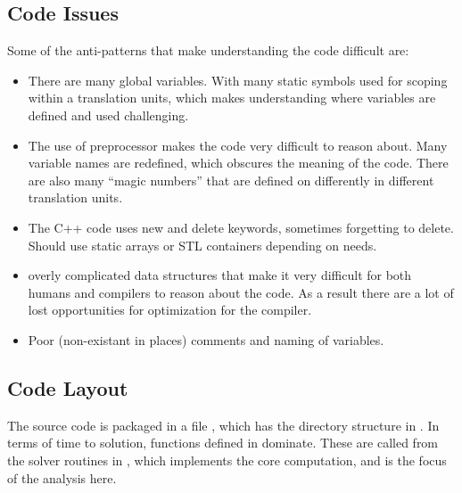 \subsection{Code Issues}
Some of the anti-patterns that make understanding the code difficult are:
\begin{itemize}
    \item
        There are many global variables. With many static symbols used for scoping within a translation units, which makes understanding where variables are defined and used challenging.
    \item
        The use of preprocessor  makes the code very difficult to reason about. Many variable names are redefined, which obscures the meaning of the code. There are also many ``magic numbers'' that are defined on differently in different translation units.
    \item
        The C++ code uses new and delete keywords, sometimes forgetting to delete. Should use static arrays or STL containers depending on needs.
    \item
        overly complicated data structures that make it very difficult for both humans and compilers to reason about the code. As a result there are a lot of lost opportunities for optimization for the compiler.
    \item
        Poor (non-existant in places) comments and naming of variables.
\end{itemize}

\subsection{Code Layout}
The source code is packaged in a file , which has the directory structure in .
In terms of time to solution, functions defined in  dominate. These are called from the solver routines in , which implements the core computation, and is the focus of the analysis here.

